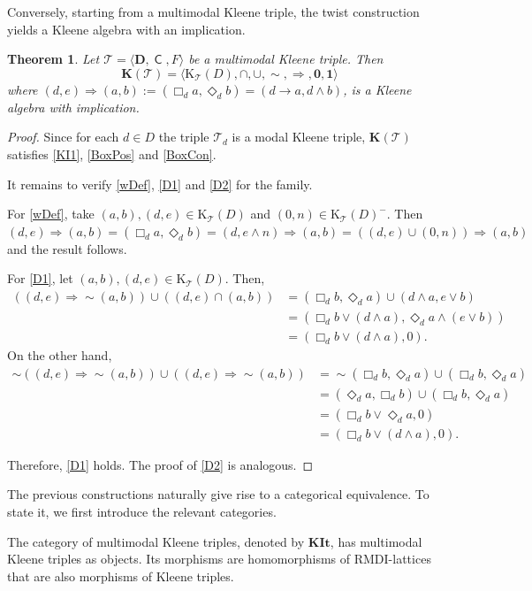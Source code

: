 \documentclass[10pt,a4paper]{amsart}
\newtheorem{theorem}{Theorem}[section]
\DeclareMathOperator{\con}{\mathsf{C}}
\newcommand{\KC}[1]{\mathrm{K}_\T(#1)}
\newcommand{\one}{\mathbf{1}}
\newcommand{\zero}{\mathbf{0}}
\newcommand{\D}{\mathbf{D}}
\newcommand{\T}{\mathcal{T}}
\begin{document}
Conversely, starting from a multimodal Kleene triple, the twist construction yields a Kleene algebra with an implication.

\begin{theorem}
\label{thm:twist-modal-family}
Let $\mathcal{T}=\langle \D,\con,F\rangle$ be a multimodal Kleene triple. Then \[
\mathbf{K}(\mathcal{T})=\langle\KC{D},\cap,\cup,\sim,\Rightarrow,\zero,\one\rangle
\]
where $(d,e)\Rightarrow (a,b) := (\Box_d a, \Diamond_d b)=(d\rightarrow a,d\wedge b)$, is a Kleene algebra with implication.
\end{theorem}
\begin{proof}
Since for each $d\in D$ the triple $\mathcal{T}_d$ is a modal Kleene triple, $\mathbf{K}(\mathcal{T})$ satisfies \eqref{KI1}, \eqref{BoxPos} and \eqref{BoxCon}. 

It remains to
verify \eqref{wDef}, \eqref{D1} and \eqref{D2} for the family.

For \eqref{wDef}, take $(a,b), (d,e) \in \KC{D}$ and $(0,n)\in \KC{D}^-$. Then $(d,e)\Rightarrow (a,b) = (\Box_d a,\Diamond_d b)=(d,e\wedge n)\Rightarrow (a,b)=((d,e)\cup (0,n))\Rightarrow (a,b)$ and the result follows.

For \eqref{D1}, let $(a,b),(d,e)\in \KC{D}$. Then,
\begin{align*}
((d,e)\Rightarrow\sim (a,b))\cup((d,e)\cap (a,b))
    &=(\Box_db,\Diamond_d a)\cup (d\wedge a,e\vee b)\\
    &=(\Box_db \vee (d\wedge a),\Diamond_d a\wedge(e\vee b))\\
    &=(\Box_db \vee (d\wedge a),0).    
\end{align*}
On the other hand, 
\begin{align*}
    \sim ((d,e)\Rightarrow \sim (a,b))\cup  ((d,e)\Rightarrow \sim (a,b))
    &=\sim (\Box_db,\Diamond_d a)\cup (\Box_db,\Diamond_d a)\\
    &=(\Diamond_d a,\Box_db)\cup (\Box_db,\Diamond_d a)\\
    &=(\Box_db \vee \Diamond_d a,0)\\
    &=(\Box_db \vee (d\wedge a),0). 
\end{align*}

Therefore, \eqref{D1} holds. The proof of \eqref{D2} is analogous.
\end{proof}

The previous constructions naturally give rise to a categorical equivalence. To state it, we first introduce the relevant categories.

The category of multimodal Kleene triples, denoted by $\mathbf{KIt}$, has multimodal Kleene triples as objects. Its morphisms are homomorphisms of RMDI-lattices that are also morphisms of Kleene triples.
\end{document}
